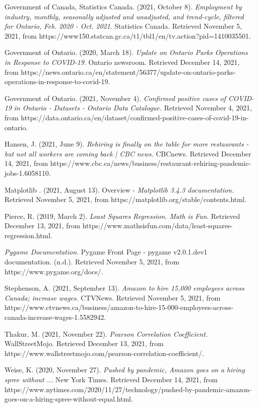 \documentclass[fontsize=11pt]{article}
\begin{document}
Government of Canada, Statistics Canada. (2021, October 8). \textit{Employment by industry, monthly, seasonally}
\hangindent=0.7cm \textit{adjusted and unadjusted, and trend-cycle, filtered for Ontario, Feb. 2020 - Oct. 2021.} Statistics Canada. Retrieved November 5, 2021, from https://www150.statcan.gc.ca/t1/tbl1/en/tv.action?pid=1410035501.
\medskip

Government of Ontario. (2020, March 18). \textit{Update on Ontario Parks Operations in Response to COVID-19.} Ontario newsroom. \hangindent=0.7cm Retrieved December 14, 2021, from https://news.ontario.ca/en/statement/56377/update-on-ontario-parks-operations-in-response-to-covid-19.
\medskip

Government of Ontario. (2021, November 4). \textit{Confirmed positive cases of COVID-19 in Ontario - Datasets - Ontario Data}
\hangindent=0.7cm \textit{Catalogue.} Retrieved November 4, 2021, from https://data.ontario.ca/en/dataset/confirmed-positive-cases-of-covid-19-in-ontario.
\medskip

Hansen, J. (2021, June 9). \textit{Rehiring is finally on the table for more restaurants - but not all workers are coming back | CBC news.} CBCnews. \hangindent=0.7cm Retrieved December 14, 2021, from https://www.cbc.ca/news/business/restaurant-rehiring-pandemic-jobs-1.6058110.
\medskip

Matplotlib . (2021, August 13). Overview - \textit{Matplotlib 3.4.3 documentation.} Retrieved November 5, 2021, from \hangindent=0.7cm https://matplotlib.org/stable/contents.html.
\medskip

Pierce, R. (2019, March 2). \textit{Least Squares Regression. Math is Fun}. \hangindent=0.7cm Retrieved December 13, 2021, from https://www.mathsisfun.com/data/least-squares-regression.html.
\medskip

\textit{Pygame Documentation.} Pygame Front Page - pygame v2.0.1.dev1 documentation. (n.d.). Retrieved November 5, \hangindent=0.7cm 2021, from https://www.pygame.org/docs/.
\medskip

Stephenson, A. (2021, September 13). \textit{Amazon to hire 15,000 employees across Canada; increase wages.} CTVNews. \hangindent=0.7cm Retrieved November 5, 2021, from https://www.ctvnews.ca/business/amazon-to-hire-15-000-employees-across-canada-increase-wages-1.5582942.
\medskip

Thakur, M. (2021, November 22). \textit{Pearson Correlation Coefficient.} WallStreetMojo. \hangindent=0.7cm Retrieved December 13, 2021, from https://www.wallstreetmojo.com/pearson-correlation-coefficient/.
\medskip

Weise, K. (2020, November 27). \textit{Pushed by pandemic, Amazon goes on a hiring spree without ...} \hangindent=0.7cm New York Times. Retrieved December 14, 2021, from https://www.nytimes.com/2020/11/27/technology/pushed-by-pandemic-amazon-goes-on-a-hiring-spree-without-equal.html.

\end{document}

